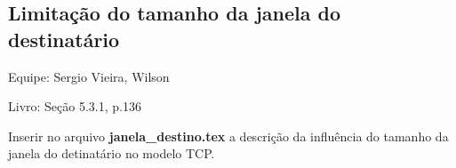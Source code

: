 \subsection{Limitação do tamanho da janela do destinatário}
Equipe: Sergio Vieira, Wilson

Livro: Seção 5.3.1, p.136

Inserir no arquivo \textbf{janela\_destino.tex} a descrição da influência do tamanho da janela 
do detinatário no modelo TCP.


